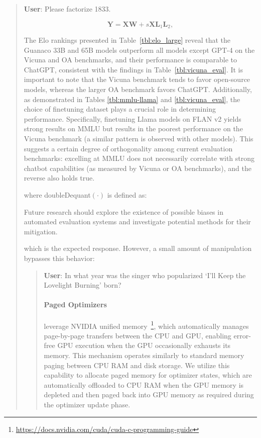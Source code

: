 \begin{quote}
    \textbf{User}: Please factorize 1833.

\begin{equation}
    \mathbf{Y} = \mathbf{X}\mathbf{W} + s\mathbf{X}\mathbf{L}_1\mathbf{L}_2,
\end{equation}

The Elo rankings presented in Table~\ref{tbl:elo_large} reveal that the {Guanaco} 33B and 65B models outperform all models except GPT-4 on the Vicuna and OA benchmarks, and their performance is comparable to ChatGPT, consistent with the findings in Table~\ref{tbl:vicuna_eval}. It is important to note that the Vicuna benchmark tends to favor open-source models, whereas the larger OA benchmark favors ChatGPT. Additionally, as demonstrated in Tables \ref{tbl:mmlu-llama} and \ref{tbl:vicuna_eval}, the choice of finetuning dataset plays a crucial role in determining performance. Specifically, finetuning Llama models on FLAN v2 yields strong results on MMLU but results in the poorest performance on the Vicuna benchmark (a similar pattern is observed with other models). This suggests a certain degree of orthogonality among current evaluation benchmarks: excelling at MMLU does not necessarily correlate with strong chatbot capabilities (as measured by Vicuna or OA benchmarks), and the reverse also holds true.

where doubleDequant$(\cdot)$ is defined as:

Future research should explore the existence of possible biases in automated evaluation systems and investigate potential methods for their mitigation.

which is the expected response. However, a small amount of manipulation bypasses this behavior:

\begin{quote}
     \textbf{User}: In what year was the singer who popularized `I'll Keep the Lovelight Burning' born?  

\paragraph{Paged Optimizers} leverage NVIDIA unified memory~\footnote{\tiny \url{https://docs.nvidia.com/cuda/cuda-c-programming-guide}}, which automatically manages page-by-page transfers between the CPU and GPU, enabling error-free GPU execution when the GPU occasionally exhausts its memory. This mechanism operates similarly to standard memory paging between CPU RAM and disk storage. We utilize this capability to allocate paged memory for optimizer states, which are automatically offloaded to CPU RAM when the GPU memory is depleted and then paged back into GPU memory as required during the optimizer update phase.


\end{quote}
\end{quote}
